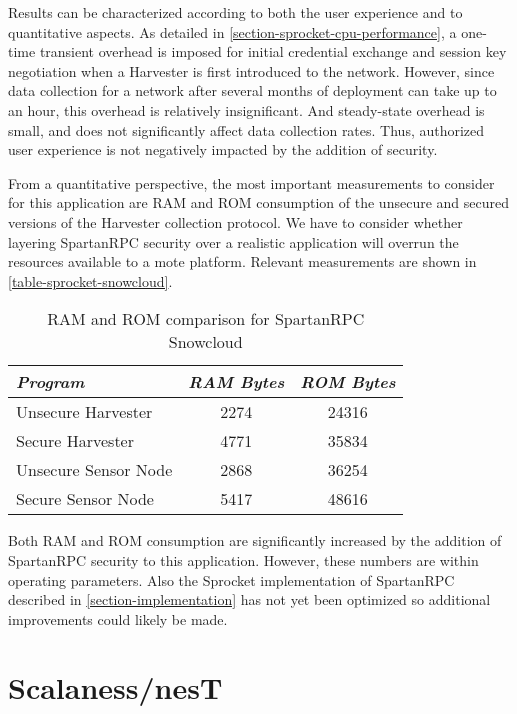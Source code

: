 Results can be characterized according to both the user experience and to quantitative aspects.
As detailed in \autoref{section-sprocket-cpu-performance}, a one-time transient overhead is
imposed for initial credential exchange and session key negotiation when a Harvester is first
introduced to the network. However, since data collection for a network after several months of
deployment can take up to an hour, this overhead is relatively insignificant. And steady-state
overhead is small, and does not significantly affect data collection rates. Thus, authorized
user experience is not negatively impacted by the addition of security.

From a quantitative perspective, the most important measurements to consider for this
application are RAM and ROM consumption of the unsecure and secured versions of the Harvester
collection protocol. We have to consider whether layering SpartanRPC security over a realistic
application will overrun the resources available to a mote platform. Relevant measurements are
shown in \autoref{table-sprocket-snowcloud}.

\begin{table}[h]
\centering \newcommand\T{\rule{0pt}{2.1ex}}
\caption{RAM and ROM comparison for SpartanRPC Snowcloud} {
\begin{tabular}{|l|c|c|}
\hline
\emph{Program} \T       & \emph{RAM Bytes} & \emph{ROM Bytes} \\ \hline\hline
Unsecure Harvester \T   &             2274 &            24316 \\ \hline
Secure Harvester \T     &             4771 &            35834 \\ \hline
Unsecure Sensor Node \T &             2868 &            36254 \\ \hline
Secure Sensor Node \T   &             5417 &            48616 \\ \hline
\end{tabular}
}
\label{table-sprocket-snowcloud}
\end{table}

Both RAM and ROM consumption are significantly increased by the addition of SpartanRPC security
to this application. However, these numbers are within operating parameters. Also the Sprocket
implementation of SpartanRPC described in \autoref{section-implementation} has not yet been
optimized so additional improvements could likely be made.

\section{Scalaness/nesT}
\label{section-scalaness-evaluation}

